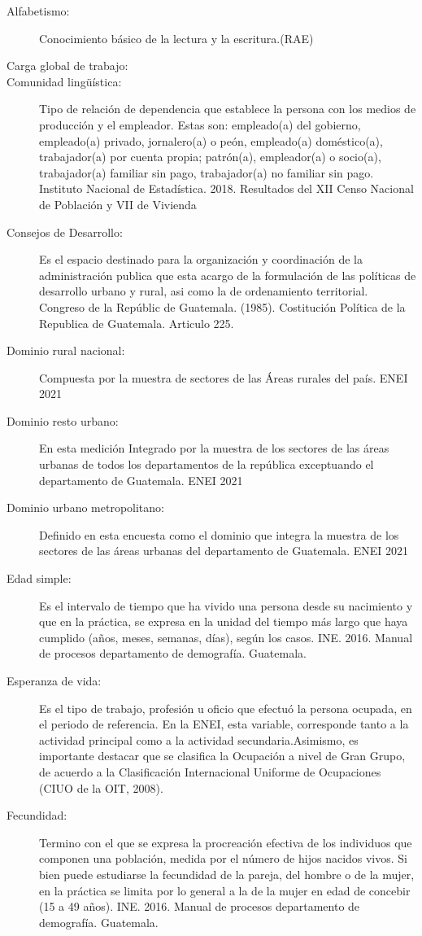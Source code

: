 \begin{description}
	\item[Alfabetismo:] Conocimiento básico de la lectura y la escritura.(RAE)
	\item[Carga global de trabajo:] 
	\item[Comunidad lingüística:] Tipo de relación de dependencia que establece la persona con los medios de producción y el empleador. Estas son: empleado(a) del gobierno, empleado(a) privado, jornalero(a) o peón, empleado(a) doméstico(a), trabajador(a) por cuenta propia; patrón(a), empleador(a) o socio(a), trabajador(a) familiar sin pago, trabajador(a) no familiar sin pago. Instituto Nacional de Estadística. 2018. Resultados del XII Censo Nacional de Población y VII de Vivienda
	\item[Consejos de Desarrollo:] Es el espacio destinado para la organización y coordinación de la administración publica que esta acargo de la formulación de las políticas de desarrollo urbano y rural, asi como la de ordenamiento territorial. Congreso de la Repúblic de Guatemala. (1985). Costitución Política de la Republica de Guatemala. Articulo 225.
	\item[Dominio rural nacional:] Compuesta por la muestra de sectores de las Áreas rurales del país. ENEI 2021
	\item[Dominio resto urbano:] En esta medición Integrado por la muestra de los sectores de las áreas urbanas de todos los departamentos de la república exceptuando el departamento de Guatemala. ENEI 2021
	\item[Dominio urbano metropolitano:] Definido en esta encuesta como el dominio que integra la muestra de los sectores de las áreas urbanas del departamento de Guatemala. ENEI 2021
	\item[Edad simple:] Es el intervalo de tiempo que ha vivido una persona desde su nacimiento y que en la práctica, se expresa en la unidad del tiempo más largo que haya cumplido (años, meses, semanas, días), según los casos.	INE. 2016. Manual de procesos departamento de demografía. Guatemala.
	\item[Esperanza de vida:] Es el tipo de trabajo, profesión u oficio que efectuó la persona ocupada, en el periodo de referencia. En la ENEI, esta variable, corresponde tanto a la actividad principal como a la actividad secundaria.Asimismo, es importante destacar que se clasifica la Ocupación a nivel de Gran Grupo, de acuerdo a la Clasificación Internacional Uniforme de Ocupaciones (CIUO de la OIT, 2008).
	\item[Fecundidad:] Termino con el que se expresa la procreación efectiva de los individuos que componen una población, medida por el número de hijos nacidos vivos. Si bien puede estudiarse la fecundidad de la pareja, del hombre o de la mujer, en la práctica se limita por lo general a la de la mujer en edad de concebir (15 a 49 años). INE. 2016. Manual de procesos departamento de demografía. Guatemala.

\end{description}
